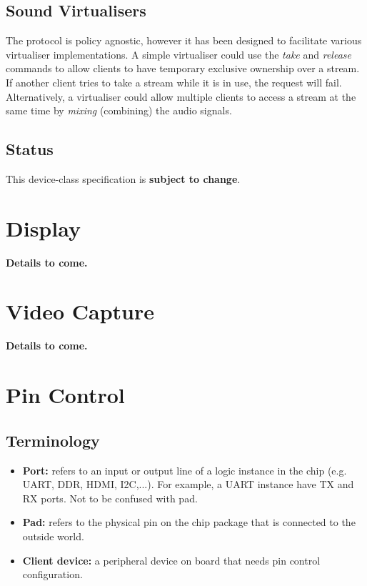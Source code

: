 \documentclass[a4paper,12pt]{report}
\newcommand{\ToCome}[1]{\textbf{#1 to come.}}
\begin{document}
\subsection{Sound Virtualisers}

The protocol is policy agnostic, however it has been designed to facilitate
various virtualiser implementations. A simple virtualiser could use the
\textit{take} and \textit{release} commands to allow clients to have temporary
exclusive ownership over a stream. If another client tries to take a stream
while it is in use, the request will fail. Alternatively, a virtualiser could
allow multiple clients to access a stream at the same time by \textit{mixing}
(combining) the audio signals.


\subsection{Status}

This device-class specification is \textbf{subject to change}.

\section{Display}\label{s:cl-display}

\ToCome{Details}

\section{Video Capture}\label{s:cl-camera}

\ToCome{Details}


\section{Pin Control}\label{s:pins}

\subsection{Terminology}
\begin{itemize}
  \item \textbf{Port:} refers to an input or output line of a logic instance in the chip
    (e.g. UART, DDR, HDMI, I2C,...). For example, a UART instance have TX and RX ports.
    Not to be confused with pad.
  \item \textbf{Pad:} refers to the physical pin on the chip package that is connected to
    the outside world.
  \item \textbf{Client device:} a peripheral device on board that needs pin control configuration.
\end{itemize}
\end{document}

